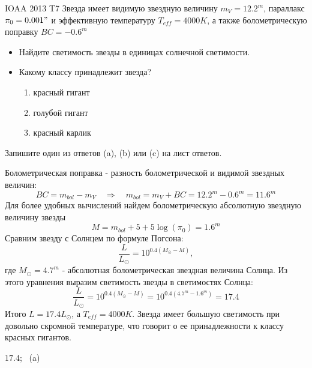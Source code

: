 \begin{problem}{IOAA 2013 T7} 
	Звезда имеет видимую звездную величину $m_V=12.2^m$, параллакс $\pi_0=0.001"$ и эффективную температуру $T_{eff}=4000K$, а также болометрическую поправку $BC=-0.6^m$
    \begin{itemize}
        \item Найдите светимость звезды в единицах солнечной светимости.
        \item Какому классу принадлежит звезда?
            \begin{enumerate}
                \item красный гигант
                \item голубой гигант
                \item красный карлик
            \end{enumerate}
    \end{itemize}
    Запишите один из ответов (a), (b) или (c) на лист ответов.

\begin{solution}
	Болометрическая поправка - разность болометрической и видимой звездных величин:
    \begin{equation}
        BC=m_{bol}-m_V \quad\Longrightarrow\quad m_{bol}=m_V+BC=12.2^m-0.6^m=11.6^m
    \end{equation}
    Для более удобных вычислений найдем болометрическую абсолютную звездную величину звезды
    \begin{equation}
        M=m_{bol}+5+5\log{(\pi_0)}=1.6^m
    \end{equation}
    Сравним звезду с Солнцем по формуле Погсона:
    \begin{equation}
        \frac{L}{L_{\odot}}=10^{0.4(M_{\odot}-M)},
    \end{equation}
    где $M_{\odot}=4.7^m$ - абсолютная болометрическая звездная величина Солнца. Из этого уравнения выразим светимость звезды в светимостях Солнца:
    \begin{equation}
        \frac{L}{L_{\odot}}=10^{0.4(M_{\odot}-M)}=10^{0.4(4.7^m-1.6^m)}=17.4
    \end{equation}
    Итого $L=17.4L_{\odot}$, а $T_{eff}=4000K$. Звезда имеет большую светимость при довольно скромной температуре, что говорит о ее принадлежности к классу красных гигантов.
\end{solution}

\begin{answer}
	$17.4$; \ 
    (a)
\end{answer}
\end{problem}